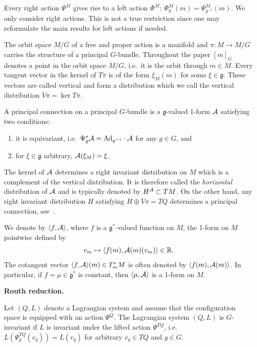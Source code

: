 \documentclass[pdftex]{sigma}
\newcommand{\R}{\mathbb{R}}
\newcommand{\A}{{\cal A}}
\newcommand{\lag}{\mathfrak{g}}
\begin{document}
Every right action $\Psi^M$ gives rise to a left action $\Phi^M$: $\Phi^M_{g}(m) = \Psi^M_{g^{-1}}(m)$. We only consider right actions. This is not a true restriction since one may reformulate the main results for left actions if needed.

The orbit space $M/G$ of a free and proper action is a manifold and $\pi:M\to M/G$ carries the structure of a principal $G$-bundle. Throughout the paper $[m]_G$ denotes a point in the orbit space $M/G$, i.e.\ it is the orbit through $m\in M$.  Every tangent vector in the kernel of $T\pi$ is of the form $\xi_M(m)$ for some $\xi\in\lag$. These vectors are called vertical and form a distribution which we call the vertical distribution $V\pi=\ker T\pi$.

\begin{definition} A principal connection on a principal $G$-bundle is a $\lag$-valued 1-form $\A$ satisfying two conditions:
\begin{enumerate}\itemsep=0pt
\item[1)] it is equivariant, i.e.\ $\Psi^*_g\A = {\rm Ad}_{g^{-1}} \cdot \A$ for any $g\in G$, and
\item[2)] for $\xi\in\lag$ arbitrary, $\A ( \xi_M)=\xi$.\end{enumerate} \end{definition}
The kernel of $\A$ determines a right invariant distribution on $M$ which is a complement of the vertical distribution. It is therefore called the {\em horizontal} distribution of $\A$ and is typically denoted by $H^{\A}\subset TM$. On the other hand, any right invariant distribution $H$ satisfying $H\oplus V\pi = TQ$ determines a principal connection, see~\cite{koba}.

We denote by $\langle f ,\A\rangle$, where $f$ is a $\lag^*$-valued function on $M$,  the 1-form on $M$ pointwise def\/ined by \[v_m\mapsto \langle f(m),\A(m)(v_m)\rangle\in \R.\] The cotangent vector $\langle f ,\A\rangle(m)\in T_m^*M$ is often denoted by $\langle f(m),\A(m)\rangle$.  In particular, if $f=\mu\in\lag^*$ is constant, then $\langle \mu,\A\rangle$ is a 1-form on $M$.

{\bf Routh reduction.}

\begin{definition} Let $(Q,L)$ denote a Lagrangian system and assume that the conf\/iguration space is equipped with an action $\Psi^Q$. The Lagrangian system $(Q,L)$ is $G$-invariant if $L$ is invariant under the lifted action $\Psi^{TQ}$, i.e.\ $L(\Psi^{TQ}_g(v_q))=L(v_q)$ for arbitrary $v_q\in TQ$ and $g\in G$.
\end{definition}
\end{document}
